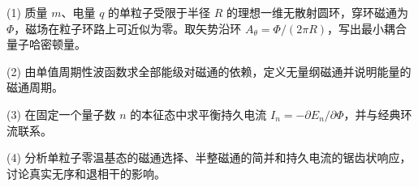(1) 质量 \(m\)、电量 \(q\) 的单粒子受限于半径 \(R\) 的理想一维无散射圆环，穿环磁通为 \(\Phi\)，磁场在粒子环路上可近似为零。取矢势沿环 \(A_\theta=\Phi/(2\pi R)\)，写出最小耦合量子哈密顿量。

(2) 由单值周期性波函数求全部能级对磁通的依赖，定义无量纲磁通并说明能量的磁通周期。

(3) 在固定一个量子数 \(n\) 的本征态中求平衡持久电流 \(I_n=-\partial E_n/\partial\Phi\)，并与经典环流联系。

(4) 分析单粒子零温基态的磁通选择、半整磁通的简并和持久电流的锯齿状响应，讨论真实无序和退相干的影响。
